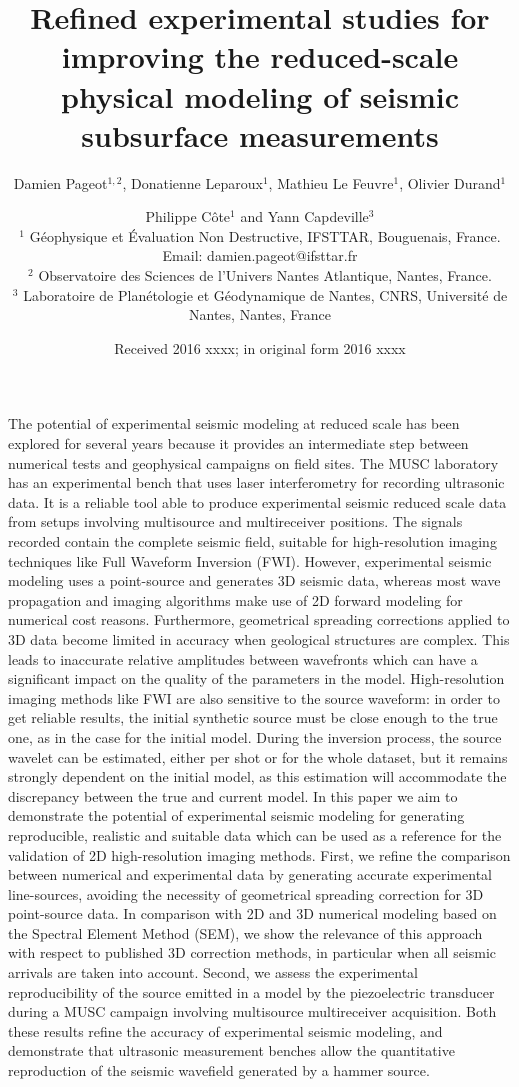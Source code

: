 \documentclass[extra,mreferee]{gji}
\title[Refined experimental studies for improving the reduced-scale physical modeling]
  {Refined experimental studies for improving the reduced-scale physical modeling of seismic subsurface measurements}
\author[D. Pageot \textit{et al.}]
  {Damien Pageot$^{1,2}$, Donatienne Leparoux$^1$, Mathieu Le Feuvre$^1$, Olivier Durand$^1$ \and Philippe C\^ote$^1$ and Yann Capdeville$^3$ \\
  $^1$ G\'eophysique et \'Evaluation Non Destructive, IFSTTAR, Bouguenais, France. Email: damien.pageot@ifsttar.fr \\
  $^2$ Observatoire des Sciences de l'Univers Nantes Atlantique, Nantes, France. \\
  $^3$ Laboratoire de Plan\'etologie et G\'eodynamique de Nantes, CNRS, Universit\'e de Nantes, Nantes, France \\
  }
\date{Received 2016 xxxx; in original form 2016 xxxx}
\begin{document}
\linenumbers

\label{firstpage}

\maketitle

\begin{summary}
The potential of experimental seismic modeling at reduced scale has been explored for several years because it provides an intermediate step between numerical tests and geophysical campaigns on field sites. The MUSC laboratory has an experimental bench that uses laser interferometry for recording ultrasonic data. It is a reliable tool able to produce experimental seismic reduced scale data from setups involving multisource and multireceiver positions. The signals recorded contain the complete seismic field, suitable for high-resolution imaging techniques like Full Waveform Inversion (FWI). However, experimental seismic modeling uses a point-source and generates 3D seismic data, whereas most wave propagation and imaging algorithms make use of 2D forward modeling for numerical cost reasons. Furthermore, geometrical spreading corrections applied to 3D data become limited in accuracy when geological structures are complex. This leads to inaccurate relative amplitudes between wavefronts which can have a significant impact on the quality of the parameters in the model. High-resolution imaging methods like FWI are also sensitive to the source waveform: in order to get reliable results, the initial synthetic source must be close enough to the true one, as in the case for the initial model. During the inversion process, the source wavelet can be estimated, either per shot or for the whole dataset, but it remains strongly dependent on the initial model, as this estimation will accommodate the discrepancy between the true and current model. In this paper we aim to demonstrate the potential of experimental seismic modeling for generating reproducible, realistic and suitable data which can be used as a reference for the validation of 2D high-resolution imaging methods. First, we refine the comparison between numerical and experimental data by generating accurate experimental line-sources, avoiding the necessity of geometrical spreading correction for 3D point-source data. In comparison with 2D and 3D numerical modeling based on the Spectral Element Method (SEM), we show the relevance of this approach with respect to published 3D correction methods, in particular when all seismic arrivals are taken into account. Second, we assess the experimental reproducibility of the source emitted in a model by the piezoelectric transducer during a MUSC campaign involving multisource multireceiver acquisition. Both these results refine the accuracy of experimental seismic modeling, and demonstrate that ultrasonic measurement benches allow the quantitative reproduction of the seismic wavefield generated by a hammer source. 
\end{summary}
\end{document}
